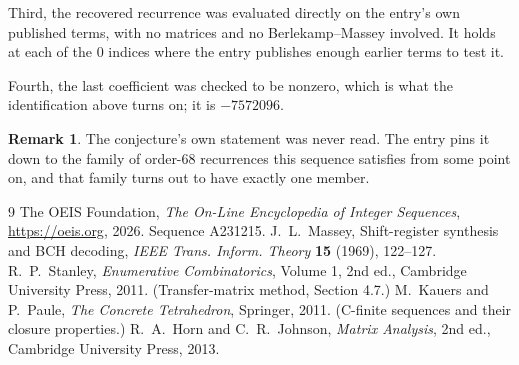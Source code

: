 \documentclass[11pt,a4paper]{article}
\theoremstyle{plain}
\theoremstyle{definition}
\newtheorem{remark}[theorem]{Remark}
\begin{document}
Third, the recovered recurrence was evaluated directly on the entry's own published terms, with
no matrices and no Berlekamp--Massey involved. It holds at each of the $0$ indices where
the entry publishes enough earlier terms to test it.

Fourth, the last coefficient was checked to be nonzero, which is what the identification above
turns on; it is $-7572096$.

\begin{remark}
The conjecture's own statement was never read. The entry pins it down to the family of
order-$68$ recurrences this sequence satisfies from some point on, and that family turns
out to have exactly one member.
\end{remark}

\begin{thebibliography}{9}
 The OEIS Foundation, \emph{The On-Line Encyclopedia of Integer
Sequences}, \url{https://oeis.org}, 2026. Sequence A231215.
 J.~L.~Massey, Shift-register synthesis and BCH decoding, \emph{IEEE
Trans. Inform. Theory} \textbf{15} (1969), 122--127.
 R.~P.~Stanley, \emph{Enumerative Combinatorics}, Volume 1, 2nd ed.,
Cambridge University Press, 2011. (Transfer-matrix method, Section 4.7.)
 M.~Kauers and P.~Paule, \emph{The Concrete Tetrahedron}, Springer, 2011.
(C-finite sequences and their closure properties.)
 R.~A.~Horn and C.~R.~Johnson, \emph{Matrix Analysis}, 2nd ed., Cambridge
University Press, 2013.
\end{thebibliography}
\end{document}
